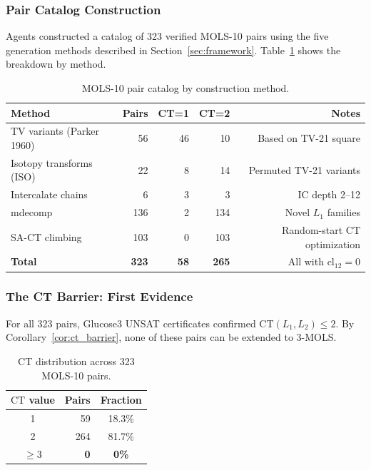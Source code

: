 \documentclass[11pt,a4paper]{article}
\theoremstyle{remark}
\newcommand{\CT}{\mathrm{CT}}
\newcommand{\cl}{\mathrm{cl}}
\begin{document}
\subsubsection{Pair Catalog Construction}

Agents constructed a catalog of 323 verified MOLS-10 pairs using the five generation
methods described in Section~\ref{sec:framework}. Table~\ref{tab:catalog} shows the
breakdown by method.

\begin{table}[h]
\centering
\caption{MOLS-10 pair catalog by construction method.}\label{tab:catalog}
\begin{tabular}{lrrrr}
\toprule
Method & Pairs & CT=1 & CT=2 & Notes\\
\midrule
TV variants (Parker 1960) & 56 & 46 & 10 & Based on TV-21 square\\
Isotopy transforms (ISO) & 22 & 8 & 14 & Permuted TV-21 variants\\
Intercalate chains & 6 & 3 & 3 & IC depth 2--12\\
mdecomp & 136 & 2 & 134 & Novel $L_1$ families\\
SA-CT climbing & 103 & 0 & 103 & Random-start CT optimization\\
\midrule
\textbf{Total} & \textbf{323} & \textbf{58} & \textbf{265} & All with $\cl_{12}=0$\\
\bottomrule
\end{tabular}
\end{table}

\subsubsection{The CT Barrier: First Evidence}

For all 323 pairs, Glucose3 UNSAT certificates confirmed $\CT(L_1,L_2) \leq 2$.
By Corollary~\ref{cor:ct_barrier}, none of these pairs can be extended to 3-MOLS.

\begin{table}[h]
\centering
\caption{CT distribution across 323 MOLS-10 pairs.}\label{tab:ct}
\begin{tabular}{crc}
\toprule
$\CT$ value & Pairs & Fraction\\
\midrule
1 & 59 & 18.3\%\\
2 & 264 & 81.7\%\\
$\geq 3$ & \textbf{0} & \textbf{0\%}\\
\bottomrule
\end{tabular}
\end{table}
\end{document}
